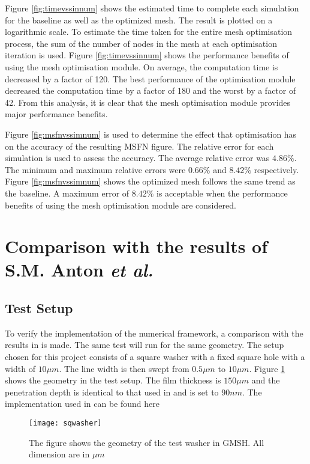 Figure \ref{fig:timevssinnum} shows the estimated time to complete each simulation for the baseline as well as the optimized mesh. The result is plotted on a logarithmic scale. To estimate the time taken for the entire mesh optimisation process, the sum of the number of nodes in the mesh at each optimisation iteration is used. Figure \ref{fig:timevssinnum} shows the performance benefits of using the mesh optimisation module. On average, the computation time is decreased by a factor of 120. The best performance of the optimisation module decreased the computation time by a factor of 180 and the worst by a factor of 42. From this analysis, it is clear that the mesh optimisation module provides major performance benefits. \par
Figure \ref{fig:msfnvssimnum} is used to determine the effect that optimisation has on the accuracy of the resulting MSFN figure. The relative error for each simulation is used to assess the accuracy. The average relative error was $4.86\%$. The minimum and maximum relative errors were $0.66\%$ and $8.42\%$ respectively. Figure \ref{fig:msfnvssimnum} shows the optimized mesh follows the same trend as the baseline. A maximum error of $8.42\%$ is acceptable when the performance benefits of using the mesh optimisation module are considered.

\section{Comparison with the results of S.M. Anton \textit{et al.}}
\subsection{Test Setup}
To verify the implementation of the numerical framework, a comparison with the results in \cite{fluxNoiseSquidsStevenAnton} is made. The same test will run for the same geometry. The setup chosen for this project consists of a square washer with a fixed square hole with a width of $10 \mu m$. The line width is then swept from $0.5 \mu m$ to $10 \mu m$. Figure \ref{fig:sqwasher} shows the geometry in the test setup. The film thickness is $150 \mu m$ and the penetration depth is identical to that used in \cite{fluxNoiseSquidsStevenAnton} and is set to $90 nm$. The implementation used in \cite{fluxNoiseSquidsStevenAnton} can be found here \cite{msfnCode} 

\begin{figure}[H]
    \centering
    \texttt{[image: sqwasher]}
    \caption{The figure shows the geometry of the test washer in GMSH. All dimension are in $\mu m$}
    \label{fig:sqwasher}
\end{figure}

